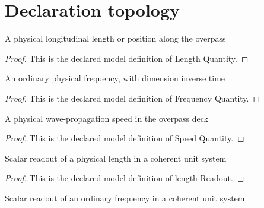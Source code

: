 \section{Declaration topology}
\begin{definition}
  \label{def:physics:phyx-mini-0210:phyxminiproblems-problemphyxmini0210-lengthquantity}
  A physical longitudinal length or position along the overpass
\end{definition}
\begin{proof}
  This is the declared model definition of Length Quantity.
\end{proof}
\begin{definition}
  \label{def:physics:phyx-mini-0210:phyxminiproblems-problemphyxmini0210-frequencyquantity}
  An ordinary physical frequency, with dimension inverse time
\end{definition}
\begin{proof}
  This is the declared model definition of Frequency Quantity.
\end{proof}
\begin{definition}
  \label{def:physics:phyx-mini-0210:phyxminiproblems-problemphyxmini0210-speedquantity}
  A physical wave-propagation speed in the overpass deck
\end{definition}
\begin{proof}
  This is the declared model definition of Speed Quantity.
\end{proof}
\begin{definition}
  \label{def:physics:phyx-mini-0210:phyxminiproblems-problemphyxmini0210-lengthreadout}
  Scalar readout of a physical length in a coherent unit system
\end{definition}
\begin{proof}
  This is the declared model definition of length Readout.
\end{proof}
\begin{definition}
  \label{def:physics:phyx-mini-0210:phyxminiproblems-problemphyxmini0210-frequencyreadout}
  Scalar readout of an ordinary frequency in a coherent unit system
\end{definition}
